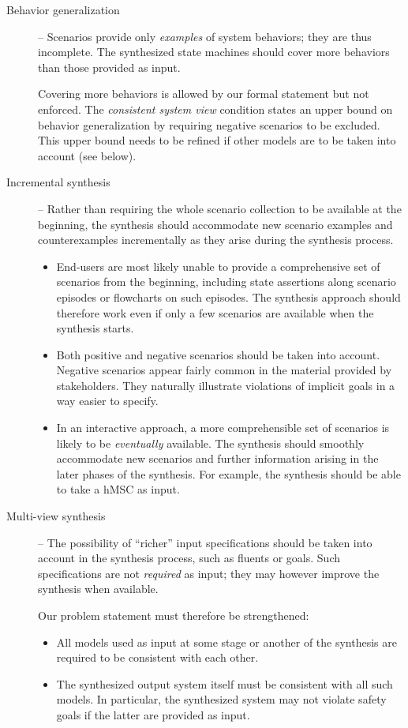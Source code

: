 \begin{description}
\item[Behavior generalization] -- Scenarios provide only \emph{examples} of system behaviors; they are thus incomplete. The synthesized state machines should cover more behaviors than those provided as input. 

Covering more behaviors is allowed by our formal statement but not enforced. The \emph{consistent system view} condition states an upper bound on behavior generalization by requiring negative scenarios to be excluded. This upper bound needs to be refined if other models are to be taken into account (see below).

\item[Incremental synthesis] -- Rather than requiring the whole scenario collection to be available at the beginning, the synthesis should accommodate new scenario examples and counterexamples incrementally as they arise during the synthesis process.
\begin{itemize}

\item End-users are most likely unable to provide a comprehensive set of scenarios from the beginning, including state assertions along scenario episodes or flowcharts on such episodes. The synthesis approach should therefore work even if only a few scenarios are available when the synthesis starts.

\item Both positive and negative scenarios should be taken into account. Negative scenarios appear fairly common in the material provided by stakeholders. They naturally illustrate violations of implicit goals in a way easier to specify.

\item In an interactive approach, a more comprehensible set of scenarios is likely to be \emph{eventually} available. The synthesis should smoothly accommodate new scenarios and further information arising in the later phases of the synthesis. For example, the synthesis should be able to take a hMSC as input. 

\end{itemize}

\item[Multi-view synthesis] -- The possibility of ``richer'' input specifications should be taken into account in the synthesis process, such as fluents or goals. Such specifications are not \emph{required} as input; they may however improve the synthesis when available. 

\noindent Our problem statement must therefore be strengthened: 
\begin{itemize}
\item All models used as input at some stage or another of the synthesis are required to be consistent with each other. 
\item The synthesized output system itself must be consistent with all such models. In particular, the synthesized system may not violate safety goals if the latter are provided as input.
\end{itemize}

\end{description}


